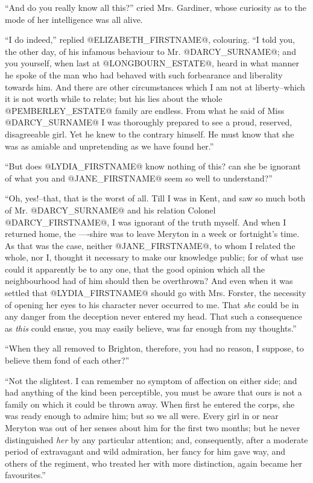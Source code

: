 ``And do you really know all this?'' cried Mrs. Gardiner, whose curiosity
as to the mode of her intelligence was all alive.

``I do indeed,'' replied @ELIZABETH_FIRSTNAME@, colouring. ``I told you, the other day,
of his infamous behaviour to Mr. @DARCY_SURNAME@; and you yourself, when last at
@LONGBOURN_ESTATE@, heard in what manner he spoke of the man who had behaved
with such forbearance and liberality towards him. And there are other
circumstances which I am not at liberty--which it is not worth while to
relate; but his lies about the whole @PEMBERLEY_ESTATE@ family are endless. From
what he said of Miss @DARCY_SURNAME@ I was thoroughly prepared to see a proud,
reserved, disagreeable girl. Yet he knew to the contrary himself. He
must know that she was as amiable and unpretending as we have found
her.''

``But does @LYDIA_FIRSTNAME@ know nothing of this? can she be ignorant of what you
and @JANE_FIRSTNAME@ seem so well to understand?''

``Oh, yes!--that, that is the worst of all. Till I was in Kent, and saw
so much both of Mr. @DARCY_SURNAME@ and his relation Colonel @DARCY_FIRSTNAME@, I was
ignorant of the truth myself. And when I returned home, the ----shire
was to leave Meryton in a week or fortnight's time. As that was the
case, neither @JANE_FIRSTNAME@, to whom I related the whole, nor I, thought it
necessary to make our knowledge public; for of what use could
it apparently be to any one, that the good opinion which all the
neighbourhood had of him should then be overthrown? And even when it was
settled that @LYDIA_FIRSTNAME@ should go with Mrs. Forster, the necessity of opening
her eyes to his character never occurred to me. That \textit{she} could be
in any danger from the deception never entered my head. That such a
consequence as \textit{this} could ensue, you may easily believe, was far
enough from my thoughts.''

``When they all removed to Brighton, therefore, you had no reason, I
suppose, to believe them fond of each other?''

``Not the slightest. I can remember no symptom of affection on either
side; and had anything of the kind been perceptible, you must be aware
that ours is not a family on which it could be thrown away. When first
he entered the corps, she was ready enough to admire him; but so we all
were. Every girl in or near Meryton was out of her senses about him for
the first two months; but he never distinguished \textit{her} by any particular
attention; and, consequently, after a moderate period of extravagant and
wild admiration, her fancy for him gave way, and others of the regiment,
who treated her with more distinction, again became her favourites.''

